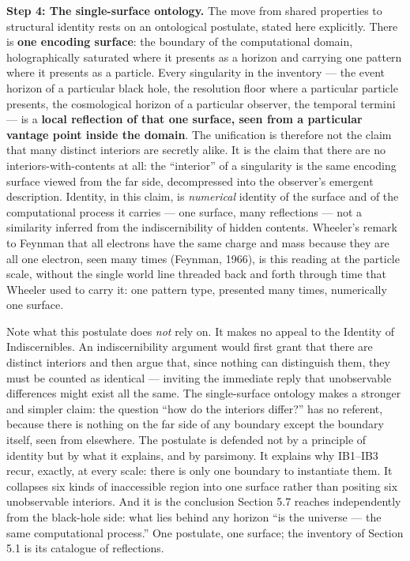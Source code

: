 \documentclass[
]{article}
\begin{document}
\textbf{Step 4: The single-surface ontology.} The move from shared
properties to structural identity rests on an ontological postulate,
stated here explicitly. There is \textbf{one encoding surface}: the
boundary of the computational domain, holographically saturated where it
presents as a horizon and carrying one pattern where it presents as a
particle. Every singularity in the inventory --- the event horizon of a
particular black hole, the resolution floor where a particular particle
presents, the cosmological horizon of a particular observer, the
temporal termini --- is a \textbf{local reflection of that one surface,
seen from a particular vantage point inside the domain}. The unification
is therefore not the claim that many distinct interiors are secretly
alike. It is the claim that there are no interiors-with-contents at all:
the ``interior'' of a singularity is the same encoding surface viewed
from the far side, decompressed into the observer's emergent
description. Identity, in this claim, is \emph{numerical} identity of
the surface and of the computational process it carries --- one surface,
many reflections --- not a similarity inferred from the indiscernibility
of hidden contents. Wheeler's remark to Feynman that all electrons have
the same charge and mass because they are all one electron, seen many
times (Feynman, 1966), is this reading at the particle scale, without
the single world line threaded back and forth through time that Wheeler
used to carry it: one pattern type, presented many times, numerically
one surface.

Note what this postulate does \emph{not} rely on. It makes no appeal to
the Identity of Indiscernibles. An indiscernibility argument would first
grant that there are distinct interiors and then argue that, since
nothing can distinguish them, they must be counted as identical ---
inviting the immediate reply that unobservable differences might exist
all the same. The single-surface ontology makes a stronger and simpler
claim: the question ``how do the interiors differ?'' has no referent,
because there is nothing on the far side of any boundary except the
boundary itself, seen from elsewhere. The postulate is defended not by a
principle of identity but by what it explains, and by parsimony. It
explains why IB1--IB3 recur, exactly, at every scale: there is only one
boundary to instantiate them. It collapses six kinds of inaccessible
region into one surface rather than positing six unobservable interiors.
And it is the conclusion Section 5.7 reaches independently from the
black-hole side: what lies behind any horizon ``is the universe --- the
same computational process.'' One postulate, one surface; the inventory
of Section 5.1 is its catalogue of reflections.
\end{document}

